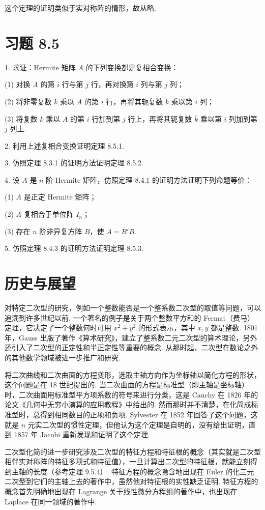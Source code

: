 \documentclass[UTF8,12pt,a4paper,fontset=fandol]{ctexart}
\begin{document}
这个定理的证明类似于实对称阵的情形，故从略.

\section*{习题 8.5}

1. 求证：Hermite 矩阵 $A$ 的下列变换都是复相合变换：

(1) 对换 $A$ 的第 $i$ 行与第 $j$ 行，再对换第 $i$ 列与第 $j$ 列；

(2) 将非零复数 $k$ 乘以 $A$ 的第 $i$ 行，再将其轭复数 $\overline{k}$ 乘以第 $i$ 列；

(3) 将复数 $k$ 乘以 $A$ 的第 $i$ 行加到第 $j$ 行上，再将其轭复数 $\overline{k}$ 乘以第 $i$ 列加到第 $j$ 列上.

2. 利用上述复相合变换证明定理 8.5.1.

3. 仿照定理 8.3.1 的证明方法证明定理 8.5.2.

4. 设 $A$ 是 $n$ 阶 Hermite 矩阵，仿照定理 8.4.1 的证明方法证明下列命题等价：

(1) $A$ 是正定 Hermite 矩阵；

(2) $A$ 复相合于单位阵 $I_n$；

(3) 存在 $n$ 阶非异复方阵 $B$，使 $A=\overline{B}'B$.

5. 仿照定理 8.4.3 的证明方法证明定理 8.5.3.

\section*{历史与展望}

对特定二次型的研究，例如一个整数能否是一个整系数二次型的取值等问题，可以追溯到许多世纪以前. 一个著名的例子是关于两个整数平方和的 Fermat（费马）定理，它决定了一个整数何时可用 $x^2+y^2$ 的形式表示，其中 $x,y$ 都是整数. 1801 年，Gauss 出版了著作《算术研究》，建立了整系数二元二次型的算术理论，另外还引入了二次型的正定性和半正定性等重要的概念. 从那时起，二次型在数论之外的其他数学领域被进一步推广和研究.

将二次曲线和二次曲面的方程变形，选取主轴方向作为坐标轴以简化方程的形状，这个问题是在 18 世纪提出的. 当二次曲面的方程是标准型（即主轴是坐标轴）时，二次曲面用标准型平方项系数的符号来进行分类，这是 Cauchy 在 1826 年的论文《几何中无穷小演算的应用教程》中给出的. 然而那时并不清楚，在化简成标准型时，总得到相同数目的正项和负项. Sylvester 在 1852 年回答了这个问题，这就是 $n$ 元实二次型的惯性定理，但他认为这个定理是自明的，没有给出证明，直到 1857 年 Jacobi 重新发现和证明了这个定理.

二次型化简的进一步研究涉及二次型的特征方程和特征根的概念（其实就是二次型相伴实对称阵的特征多项式和特征值），一旦计算出二次型的特征根，就能立刻得到主轴的长度（参考定理 9.5.4）. 特征方程的概念隐含地出现在 Euler 的化三元二次型到它们的主轴上去的著作中，虽然他对特征根的实性缺乏证明. 特征方程的概念首先明确地出现在 Lagrange 关于线性微分方程组的著作中，也出现在 Laplace 在同一领域的著作中.
\end{document}

